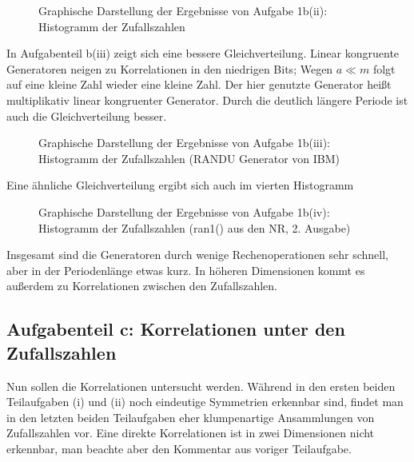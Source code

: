 \begin{landscape}
	\begin{figure}
		\caption{Graphische Darstellung der Ergebnisse von Aufgabe 1b(ii): Histogramm der Zufallszahlen}
		\label{fig:1b2}
	\end{figure}
\end{landscape}

In Aufgabenteil b(iii) zeigt sich eine bessere Gleichverteilung. Linear kongruente Generatoren neigen zu Korrelationen in den niedrigen Bits; Wegen $a \ll m$ folgt auf eine kleine Zahl wieder eine kleine Zahl. Der hier genutzte Generator heißt multiplikativ linear kongruenter Generator.
Durch die deutlich längere Periode ist auch die Gleichverteilung besser.

\begin{landscape}
	\begin{figure}
		\caption{Graphische Darstellung der Ergebnisse von Aufgabe 1b(iii): Histogramm der Zufallszahlen (RANDU Generator von IBM)}
		\label{fig:1b3}
	\end{figure}
\end{landscape}

Eine ähnliche Gleichverteilung ergibt sich auch im vierten Histogramm
\begin{landscape}
	\begin{figure}
		\caption{Graphische Darstellung der Ergebnisse von Aufgabe 1b(iv): Histogramm der Zufallszahlen (ran1() aus den NR, 2. Ausgabe)}
		\label{fig:1b4}
	\end{figure}
\end{landscape}

Insgesamt sind die Generatoren durch wenige Rechenoperationen sehr schnell, aber in der Periodenlänge etwas kurz. In höheren Dimensionen kommt es außerdem zu Korrelationen zwischen den Zufallszahlen.

\subsection*{Aufgabenteil c: Korrelationen unter den Zufallszahlen}
Nun sollen die Korrelationen untersucht werden. Während in den ersten beiden Teilaufgaben (i) und (ii) noch eindeutige Symmetrien erkennbar sind, findet man in den letzten beiden Teilaufgaben eher klumpenartige Ansammlungen von Zufallszahlen vor. Eine direkte Korrelationen ist in zwei Dimensionen nicht erkennbar, man beachte aber den Kommentar aus voriger Teilaufgabe.

